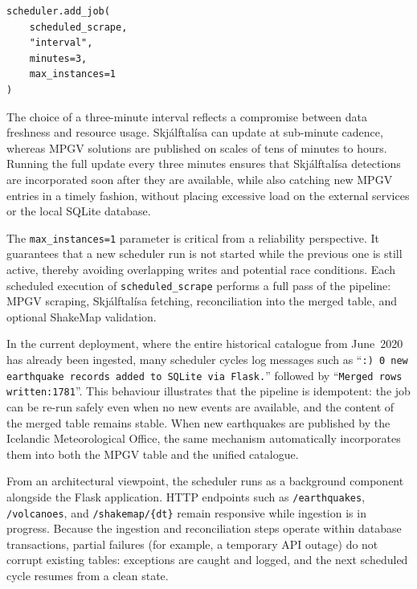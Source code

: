 \documentclass[12pt]{article}
\begin{document}
\begin{verbatim}
scheduler.add_job(
    scheduled_scrape,
    "interval",
    minutes=3,
    max_instances=1
)
\end{verbatim}

The choice of a three-minute interval reflects a compromise between data freshness and resource usage. Skjálftalísa can update at sub-minute cadence, whereas MPGV solutions are published on scales of tens of minutes to hours. Running the full update every three minutes ensures that Skjálftalísa detections are incorporated soon after they are available, while also catching new MPGV entries in a timely fashion, without placing excessive load on the external services or the local SQLite database.

The \texttt{max\_instances=1} parameter is critical from a reliability perspective. It guarantees that a new scheduler run is not started while the previous one is still active, thereby avoiding overlapping writes and potential race conditions. Each scheduled execution of \texttt{scheduled\_scrape} performs a full pass of the pipeline: MPGV scraping, Skjálftalísa fetching, reconciliation into the merged table, and optional ShakeMap validation.

In the current deployment, where the entire historical catalogue from June~2020 has already been ingested, many scheduler cycles log messages such as \enquote{\texttt{:)\ 0 new earthquake records added to SQLite via Flask.}} followed by \enquote{\texttt{Merged rows written:1781}}. This behaviour illustrates that the pipeline is idempotent: the job can be re-run safely even when no new events are available, and the content of the merged table remains stable. When new earthquakes are published by the Icelandic Meteorological Office, the same mechanism automatically incorporates them into both the MPGV table and the unified catalogue.

From an architectural viewpoint, the scheduler runs as a background component alongside the Flask application. HTTP endpoints such as \texttt{/earthquakes}, \texttt{/volcanoes}, and \texttt{/shakemap/\{dt\}} remain responsive while ingestion is in progress. Because the ingestion and reconciliation steps operate within database transactions, partial failures (for example, a temporary API outage) do not corrupt existing tables: exceptions are caught and logged, and the next scheduled cycle resumes from a clean state.

\vspace{0.7cm}
\end{document}
